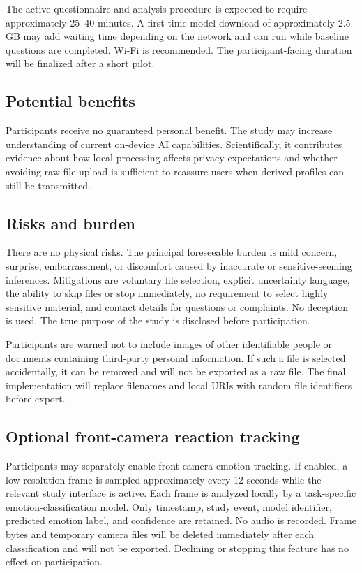 \documentclass[10pt,a4paper]{article}
\begin{document}

The active questionnaire and analysis procedure is expected to require approximately 25--40 minutes. A first-time model download of approximately 2.5 GB may add waiting time depending on the network and can run while baseline questions are completed. Wi-Fi is recommended. The participant-facing duration will be finalized after a short pilot.

\subsection*{Potential benefits}
Participants receive no guaranteed personal benefit. The study may increase understanding of current on-device AI capabilities. Scientifically, it contributes evidence about how local processing affects privacy expectations and whether avoiding raw-file upload is sufficient to reassure users when derived profiles can still be transmitted.

\subsection*{Risks and burden}
There are no physical risks. The principal foreseeable burden is mild concern, surprise, embarrassment, or discomfort caused by inaccurate or sensitive-seeming inferences. Mitigations are voluntary file selection, explicit uncertainty language, the ability to skip files or stop immediately, no requirement to select highly sensitive material, and contact details for questions or complaints. No deception is used. The true purpose of the study is disclosed before participation.

Participants are warned not to include images of other identifiable people or documents containing third-party personal information. If such a file is selected accidentally, it can be removed and will not be exported as a raw file. The final implementation will replace filenames and local URIs with random file identifiers before export.

\subsection*{Optional front-camera reaction tracking}
Participants may separately enable front-camera emotion tracking. If enabled, a low-resolution frame is sampled approximately every 12 seconds while the relevant study interface is active. Each frame is analyzed locally by a task-specific emotion-classification model. Only timestamp, study event, model identifier, predicted emotion label, and confidence are retained. No audio is recorded. Frame bytes and temporary camera files will be deleted immediately after each classification and will not be exported. Declining or stopping this feature has no effect on participation.
\end{document}
